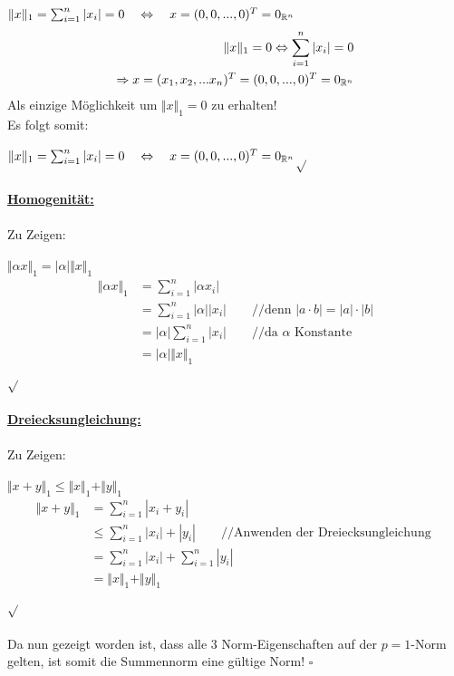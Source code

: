 \documentclass{llncs}
\begin{document}
$\Vert x \Vert_1 =\sum^n_{i=1} |x_i|=0\quad\Leftrightarrow\quad x=(0,0,...,0)^T=0_{\mathbb{R}^n}$
\\
\begin{align*}
\Vert x \Vert_1 = 0 \Leftrightarrow  \sum^n_{i=1} |x_i|=0\\
\Rightarrow x=(x_1,x_2,...x_n)^T=(0,0,...,0)^T=0_{\mathbb{R}^n}
\end{align*}
Als einzige Möglichkeit um $\Vert x \Vert_1 = 0$ zu erhalten!\\
Es folgt somit:

$\Vert x \Vert_1 =\sum^n_{i=1} |x_i|=0\quad\Leftrightarrow\quad x=(0,0,...,0)^T=0_{\mathbb{R}^n}$\hfill$\sqrt{}$\\\\
\underline{\textbf{Homogenität:}}\\\\
Zu Zeigen:

$\Vert \alpha x \Vert_1=|\alpha | \Vert x \Vert_1$\\
\begin{align*}
\Vert\alpha x \Vert_1 
&= \sum^n_{i=1} |\alpha x_i|\\
&=\sum^n_{i=1} |\alpha| |x_i| \quad\quad\text{//denn  }|a\cdot b|=|a| \cdot |b| \\
&=|\alpha|\sum^n_{i=1}  |x_i| \quad\quad\text{//da }\alpha \text{ Konstante}\\
&=|\alpha|\Vert x \Vert_1 
\end{align*} \hfill$\sqrt{}$\\\\
\underline{\textbf{Dreiecksungleichung:}}\\\\
Zu Zeigen:

$\Vert x+y \Vert_1\le\Vert x \Vert_1 + \Vert y \Vert_1$\\
\begin{align*}
\Vert x+y \Vert_1
&= \sum^n_{i=1} | x_i + y_i|\\
&\le \sum^n_{i=1} | x_i| +| y_i|  \quad\quad\text{//Anwenden der Dreiecksungleichung  }\\
&= \sum^n_{i=1} | x_i| +\sum^n_{i=1}| y_i|  \\
&= \Vert x \Vert_1 + \Vert y \Vert_1 
\end{align*} \hfill$\sqrt{}$\\\\
Da nun gezeigt worden ist, dass alle 3 Norm-Eigenschaften auf der $p=1$-Norm gelten, ist somit die Summennorm eine gültige Norm! 
\hfill$\square$ 

\newpage
\end{document}
